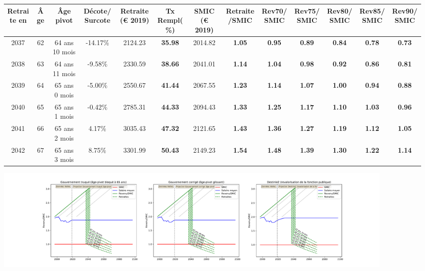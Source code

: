 { \scriptsize \begin{center} 
\begin{tabular}[htb]{|c|c||c|c||c|c||c||c|c|c|c|c|c|} 
\hline 
 Retraite en &  Âge &  Âge pivot &  Décote/Surcote &  Retraite (\euro{} 2019) &  Tx Rempl(\%) &  SMIC (\euro{} 2019) &  Retraite/SMIC &  Rev70/SMIC &  Rev75/SMIC &  Rev80/SMIC &  Rev85/SMIC &  Rev90/SMIC \\ 
\hline \hline 
 2037 &  62 &  64 ans 10 mois &  -14.17\% &  2124.23 &  {\bf 35.98} &  2014.82 &  {\bf 1.05} &  {\bf {\color{red} 0.95}} &  {\bf {\color{red} 0.89}} &  {\bf {\color{red} 0.84}} &  {\bf {\color{red} 0.78}} &  {\bf {\color{red} 0.73}} \\ 
\hline 
 2038 &  63 &  64 ans 11 mois &  -9.58\% &  2330.59 &  {\bf 38.66} &  2041.01 &  {\bf 1.14} &  {\bf 1.04} &  {\bf {\color{red} 0.98}} &  {\bf {\color{red} 0.92}} &  {\bf {\color{red} 0.86}} &  {\bf {\color{red} 0.81}} \\ 
\hline 
 2039 &  64 &  65 ans 0 mois &  -5.00\% &  2550.67 &  {\bf 41.44} &  2067.55 &  {\bf 1.23} &  {\bf 1.14} &  {\bf 1.07} &  {\bf 1.00} &  {\bf {\color{red} 0.94}} &  {\bf {\color{red} 0.88}} \\ 
\hline 
 2040 &  65 &  65 ans 1 mois &  -0.42\% &  2785.31 &  {\bf 44.33} &  2094.43 &  {\bf 1.33} &  {\bf 1.25} &  {\bf 1.17} &  {\bf 1.10} &  {\bf 1.03} &  {\bf {\color{red} 0.96}} \\ 
\hline 
 2041 &  66 &  65 ans 2 mois &  4.17\% &  3035.43 &  {\bf 47.32} &  2121.65 &  {\bf 1.43} &  {\bf 1.36} &  {\bf 1.27} &  {\bf 1.19} &  {\bf 1.12} &  {\bf 1.05} \\ 
\hline 
 2042 &  67 &  65 ans 3 mois &  8.75\% &  3301.99 &  {\bf 50.43} &  2149.23 &  {\bf 1.54} &  {\bf 1.48} &  {\bf 1.39} &  {\bf 1.30} &  {\bf 1.22} &  {\bf 1.14} \\ 
\hline 
\hline 
\end{tabular} 
\end{center} } 

 \begin{center}\includegraphics[width=0.9\textwidth]{fig/Ascendant23_1975_22_dest_retraite.pdf}\end{center} \label{fig/Ascendant23_1975_22_dest_retraite.pdf} 

